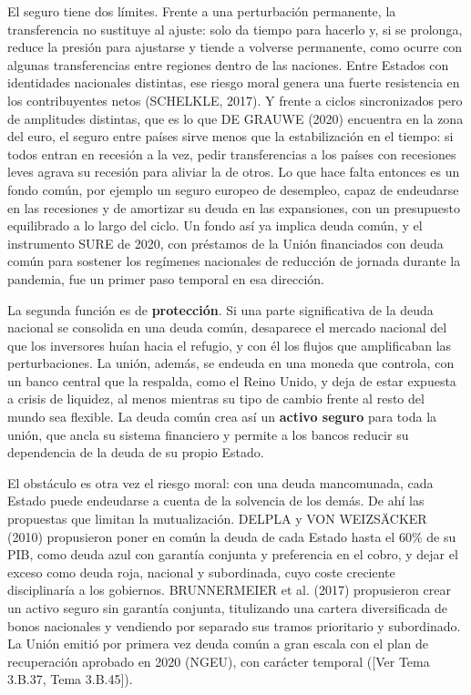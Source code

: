 \documentclass[10pt,a4paper]{article}
\newcommand{\authorfont}[1]{{\fontfamily{EBGaramond-TLF}\selectfont #1}}
\begin{document}
El seguro tiene dos límites. Frente a una perturbación permanente, la transferencia no sustituye al ajuste: solo da tiempo para hacerlo y, si se prolonga, reduce la presión para ajustarse y tiende a volverse permanente, como ocurre con algunas transferencias entre regiones dentro de las naciones. Entre Estados con identidades nacionales distintas, ese riesgo moral genera una fuerte resistencia en los contribuyentes netos (SCHELKLE, 2017). Y frente a ciclos sincronizados pero de amplitudes distintas, que es lo que DE GRAUWE (2020) encuentra en la zona del euro, el seguro entre países sirve menos que la estabilización en el tiempo: si todos entran en recesión a la vez, pedir transferencias a los países con recesiones leves agrava su recesión para aliviar la de otros. Lo que hace falta entonces es un fondo común, por ejemplo un seguro europeo de desempleo, capaz de endeudarse en las recesiones y de amortizar su deuda en las expansiones, con un presupuesto equilibrado a lo largo del ciclo. Un fondo así ya implica deuda común, y el instrumento SURE de 2020, con préstamos de la Unión financiados con deuda común para sostener los regímenes nacionales de reducción de jornada durante la pandemia, fue un primer paso temporal en esa dirección.

La segunda función es de \textbf{protección}. Si una parte significativa de la deuda nacional se consolida en una deuda común, desaparece el mercado nacional del que los inversores huían hacia el refugio, y con él los flujos que amplificaban las perturbaciones. La unión, además, se endeuda en una moneda que controla, con un banco central que la respalda, como el Reino Unido, y deja de estar expuesta a crisis de liquidez, al menos mientras su tipo de cambio frente al resto del mundo sea flexible. La deuda común crea así un \textbf{activo seguro} para toda la unión, que ancla su sistema financiero y permite a los bancos reducir su dependencia de la deuda de su propio Estado.

El obstáculo es otra vez el riesgo moral: con una deuda mancomunada, cada Estado puede endeudarse a cuenta de la solvencia de los demás. De ahí las propuestas que limitan la mutualización. DELPLA y VON WEIZSÄCKER (2010) propusieron poner en común la deuda de cada Estado hasta el $60\%$ de su PIB, como deuda azul con garantía conjunta y preferencia en el cobro, y dejar el exceso como deuda roja, nacional y subordinada, cuyo coste creciente disciplinaría a los gobiernos. BRUNNERMEIER et al. (2017) propusieron crear un activo seguro sin garantía conjunta, titulizando una cartera diversificada de bonos nacionales y vendiendo por separado sus tramos prioritario y subordinado. La Unión emitió por primera vez deuda común a gran escala con el plan de recuperación aprobado en 2020 (NGEU), con carácter temporal ([\authorfont{Ver Tema 3.B.37, Tema 3.B.45}]).
\end{document}
